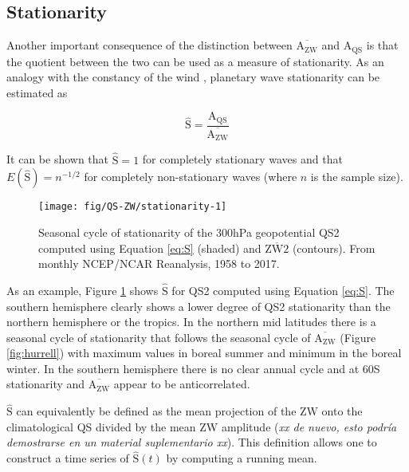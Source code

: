 \documentclass[draft,linenumbers]{agujournal2018}
\begin{document}
\subsection{Stationarity}

Another important consequence of the distinction between
\(\overline{\mathrm{A_{ZW}}}\) and \(\mathrm{A_{QS}}\) is that the
quotient between the two can be used as a measure of stationarity. As an
analogy with the constancy of the wind \citep{Singer1967}, planetary
wave stationarity can be estimated as

\begin{linenomath*}
\begin{equation}\label{eq:S}
\hat{\mathrm{S}} = \frac{\mathrm{\mathrm{A_{QS}}}}{\overline{\mathrm{A_{ZW}}}}
\end{equation}
\end{linenomath*}

It can be shown that \(\hat{\mathrm{S}} = 1\) for completely stationary
waves and that \(E(\hat{\mathrm{S}}) = n^{-1/2}\) for completely
non-stationary waves (where \(n\) is the sample size).

\begin{figure}[h]

{\centering \texttt{[image: fig/QS-ZW/stationarity-1]} 

}

\caption{Seasonal cycle of stationarity of the 300hPa geopotential QS2 computed using Equation \ref{eq:S} (shaded) and $\overline{\mathrm{ZW2}}$ (contours). From monthly NCEP/NCAR Reanalysis, 1958 to 2017.}\label{fig:stationarity}
\end{figure}

As an example, Figure \ref{fig:stationarity} shows \(\hat{\mathrm{S}}\)
for QS2 computed using Equation \ref{eq:S}. The southern hemisphere
clearly shows a lower degree of QS2 stationarity than the northern
hemisphere or the tropics. In the northern mid latitudes there is a
seasonal cycle of stationarity that follows the seasonal cycle of
\(\overline{\mathrm{A_{ZW}}}\) (Figure \ref{fig:hurrell}) with maximum
values in boreal summer and minimum in the boreal winter. In the
southern hemisphere there is no clear annual cycle and at 60\degree S
stationarity and \(\overline{\mathrm{A_{ZW}}}\) appear to be
anticorrelated.

\(\hat{\mathrm{S}}\) can equivalently be defined as the mean projection
of the ZW onto the climatological QS divided by the mean ZW amplitude
(\emph{xx de nuevo, esto podría demostrarse en un material suplementario
xx}). This definition allows one to construct a time series of
\(\hat{\mathrm{S}}(t)\) by computing a running mean.
\end{document}
